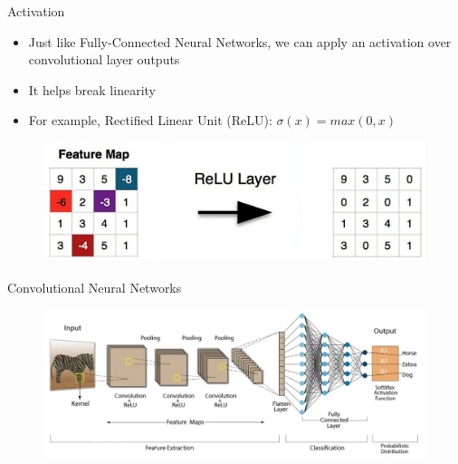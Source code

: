 \documentclass[10pt]{beamer}
\theoremstyle{remark}
\theoremstyle{definition}
\begin{document}
\begin{frame}{Activation}

\begin{itemize}
    \item Just like Fully-Connected Neural Networks, we can apply an activation over convolutional layer outputs
    \item It helps break linearity
    \item For example, Rectified Linear Unit (ReLU): $\sigma(x) = max(0,x)$
\end{itemize}


\begin{figure}
\centering
\includegraphics[width=1.0\textwidth,height=0.6\textheight,keepaspectratio]{./images/activation_relu.jpeg}
\end{figure}

\end{frame}



\begin{frame}{Convolutional Neural Networks}
\begin{figure}
\centering
\includegraphics[width=1.0\textwidth,height=0.9\textheight,keepaspectratio]{./images/cnn_arch.jpeg}
\end{figure}
    
\end{frame}
\end{document}
